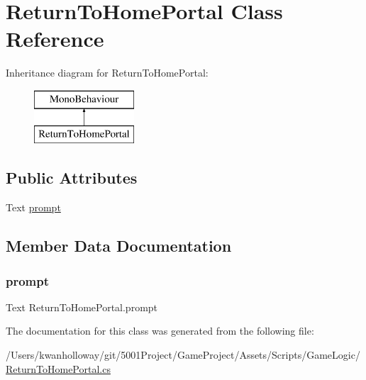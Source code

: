 \hypertarget{class_return_to_home_portal}{}\section{Return\+To\+Home\+Portal Class Reference}
\label{class_return_to_home_portal}
Inheritance diagram for Return\+To\+Home\+Portal\+:\begin{figure}[H]
\begin{center}
\leavevmode
\includegraphics[height=2.000000cm]{class_return_to_home_portal}
\end{center}
\end{figure}
\subsection*{Public Attributes}
\begin{DoxyCompactItemize}
\item 
Text \hyperlink{class_return_to_home_portal_a72ffd9acf1021ccf8b1f539a8e46ed68}{prompt}
\end{DoxyCompactItemize}


\subsection{Member Data Documentation}
\mbox{\label{class_return_to_home_portal_a72ffd9acf1021ccf8b1f539a8e46ed68}} 
\subsubsection{\texorpdfstring{prompt}{prompt}}
{\footnotesize\ttfamily Text Return\+To\+Home\+Portal.\+prompt}



The documentation for this class was generated from the following file\+:\begin{DoxyCompactItemize}
\item 
/\+Users/kwanholloway/git/5001\+Project/\+Game\+Project/\+Assets/\+Scripts/\+Game\+Logic/\hyperlink{_return_to_home_portal_8cs}{Return\+To\+Home\+Portal.\+cs}\end{DoxyCompactItemize}

